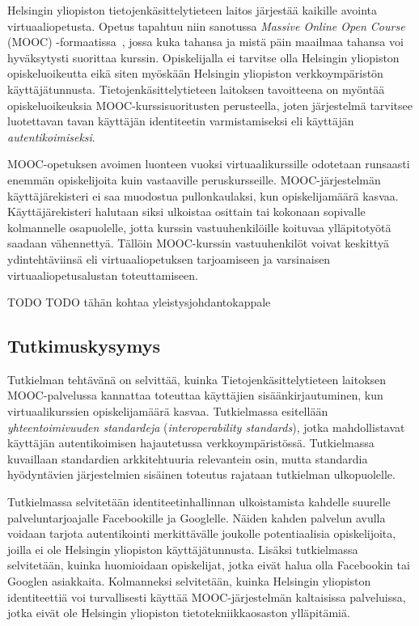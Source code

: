 \documentclass[finnish,gradu]{tktltiki}
\begin{document}
  Helsingin yliopiston tietojenkäsittelytieteen laitos järjestää kaikille avointa virtuaaliopetusta. Opetus tapahtuu niin sanotussa \emph{Massive Online Open Course} (MOOC) -formaatissa~\cite{chamberlin_mooc_2011}, jossa kuka tahansa ja mistä päin maailmaa tahansa voi hyväksytysti suorittaa kurssin. Opiskelijalla ei tarvitse olla Helsingin yliopiston opiskeluoikeutta eikä siten myöskään Helsingin yliopiston verkkoympäristön käyttäjätunnusta. Tietojenkäsittelytieteen laitoksen tavoitteena on myöntää opiskeluoikeuksia MOOC-kurssisuoritusten perusteella, joten järjestelmä tarvitsee luotettavan tavan käyttäjän identiteetin varmistamiseksi eli käyttäjän \emph{autentikoimiseksi}.

  MOOC-opetuksen avoimen luonteen vuoksi virtuaalikurssille odotetaan runsaasti enemmän opiskelijoita kuin vastaaville peruskursseille. MOOC-järjestelmän käyttäjärekisteri ei saa muodostua pullonkaulaksi, kun opiskelijamäärä kasvaa. Käyttäjärekisteri halutaan siksi ulkoistaa osittain tai kokonaan sopivalle kolmannelle osapuolelle, jotta kurssin vastuuhenkilöille koituvaa ylläpitotyötä saadaan vähennettyä. Tällöin MOOC-kurssin vastuuhenkilöt voivat keskittyä ydintehtäviinsä eli virtuaaliopetuksen tarjoamiseen ja varsinaisen virtuaaliopetusalustan toteuttamiseen.

  TODO TODO tähän kohtaa yleistysjohdantokappale



\subsection{Tutkimuskysymys} %
\label{sub:tutkimuskysymys}

Tutkielman tehtävänä on selvittää, kuinka Tietojenkäsittelytieteen laitoksen MOOC-palvelussa kannattaa toteuttaa käyttäjien sisäänkirjautuminen, kun virtuaalikurssien opiskelijamäärä kasvaa. Tutkielmassa esitellään \emph{yhteentoimivuuden standardeja} (\emph{interoperability standards}), jotka mahdollistavat käyttäjän autentikoimisen hajautetussa verkkoympäristössä. Tutkielmassa kuvaillaan standardien arkkitehtuuria relevantein osin, mutta standardia hyödyntävien järjestelmien sisäinen toteutus rajataan tutkielman ulkopuolelle.

Tutkielmassa selvitetään identiteetinhallinnan ulkoistamista kahdelle suurelle palveluntarjoajalle Facebookille ja Googlelle. Näiden kahden palvelun avulla voidaan tarjota autentikointi merkittävälle joukolle potentiaalisia opiskelijoita, joilla ei ole Helsingin yliopiston käyttäjätunnusta. Lisäksi tutkielmassa selvitetään, kuinka huomioidaan opiskelijat, jotka eivät halua olla Facebookin tai Googlen asiakkaita. Kolmanneksi selvitetään, kuinka Helsingin yliopiston identiteettiä voi turvallisesti käyttää MOOC-järjestelmän kaltaisissa palveluissa, jotka eivät ole Helsingin yliopiston tietotekniikkaosaston ylläpitämiä.
\end{document}
